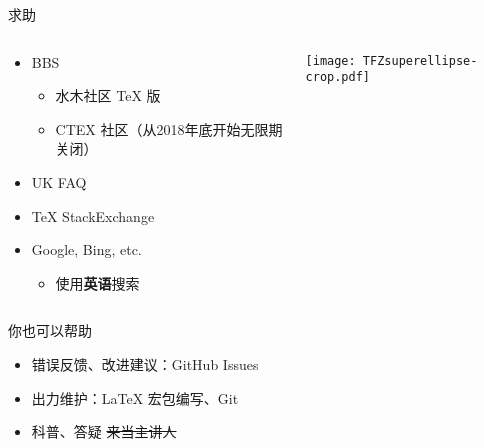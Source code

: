 \begin{frame}{求助}
  \begin{columns}[c]
    \begin{column}{.45\textwidth}
      \begin{itemize}
        \item BBS
          \begin{itemize}
            \item 水木社区 TeX 版 
            \item CTEX 社区（从2018年底开始无限期关闭）
          \end{itemize}
        \item UK FAQ 
        \item TeX StackExchange 
        \item Google, Bing, etc.
          \begin{itemize}
            \item 使用\textbf{英语}搜索
          \end{itemize}
      \end{itemize}
    \end{column}
    \begin{column}{.45\textwidth}
      \texttt{[image: TFZsuperellipse-crop.pdf]}
    \end{column}
  \end{columns}
\end{frame}

\begin{frame}{你也可以帮助}
  \begin{itemize}
    \item 错误反馈、改进建议：GitHub Issues
    \item 出力维护：LaTeX 宏包编写、Git
    \item 科普、答疑 \hspace{2em}\sout{来当主讲人}
  \end{itemize}
\end{frame}

